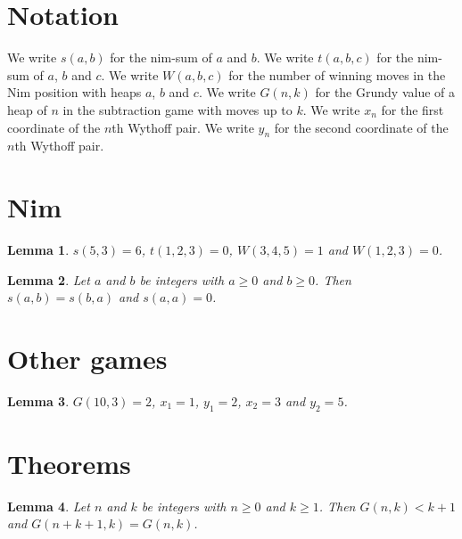 \documentclass{article}
\newtheorem{lemma}{Lemma}
\begin{document}
\section{Notation}

We write $s(a,b)$ for the nim-sum of $a$ and $b$.
We write $t(a,b,c)$ for the nim-sum of $a$, $b$ and $c$.
We write $W(a,b,c)$ for the number of winning moves in the Nim position with heaps $a$, $b$ and $c$.
We write $G(n,k)$ for the Grundy value of a heap of $n$ in the subtraction game with moves up to $k$.
We write $x_n$ for the first coordinate of the $n$th Wythoff pair.
We write $y_n$ for the second coordinate of the $n$th Wythoff pair.

\section{Nim}

\begin{lemma}\label{nim}
$s(5,3)=6$, $t(1,2,3)=0$, $W(3,4,5)=1$ and $W(1,2,3)=0$.
\end{lemma}

\begin{lemma}\label{xor}
Let $a$ and $b$ be integers with $a\ge0$ and $b\ge0$. Then $s(a,b)=s(b,a)$ and $s(a,a)=0$.
\end{lemma}

\section{Other games}

\begin{lemma}\label{other}
$G(10,3)=2$, $x_1=1$, $y_1=2$, $x_2=3$ and $y_2=5$.
\end{lemma}

\section{Theorems}

\begin{lemma}\label{bouton}
Let $n$ and $k$ be integers with $n\ge0$ and $k\ge1$. Then $G(n,k)<k+1$ and $G(n+k+1,k)=G(n,k)$.
\end{lemma}
\end{document}
